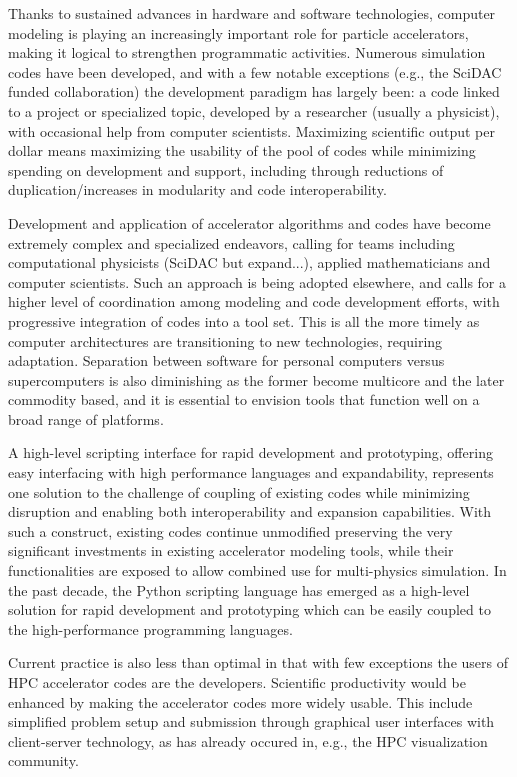 Thanks to sustained advances in hardware and software
technologies, computer modeling is playing an increasingly
important role for particle accelerators, making it logical to
strengthen programmatic activities. Numerous simulation codes
have been developed, and with a few notable exceptions (e.g., the
SciDAC funded collaboration) the development paradigm has largely
been: a code linked to a project or specialized topic, developed
by a researcher (usually a physicist), with occasional help from
computer scientists.  Maximizing scientific output per dollar
means maximizing the usability of the pool of codes while
minimizing spending on development and support, including through
reductions of duplication/increases in modularity and code
interoperability.

Development and application of accelerator algorithms and codes
have become extremely complex and specialized endeavors, calling
for teams including computational physicists (SciDAC but
expand...), applied mathematicians and computer scientists. Such
an approach is being adopted elsewhere, and calls for a higher
level of coordination among modeling and code development
efforts, with progressive integration of codes into a tool set.
This is all the more timely as computer architectures are
transitioning to new technologies, requiring adaptation.
Separation between software for personal computers versus
supercomputers is also diminishing as the former become multicore
and the later commodity based, and it is essential to envision
tools that function well on a broad range of platforms.

A high-level scripting interface for rapid development and
prototyping, offering easy interfacing with high performance
languages and expandability, represents one solution to the
challenge of coupling of existing codes while minimizing
disruption and enabling both interoperability and expansion
capabilities. With such a construct, existing codes continue
unmodified preserving the very significant investments in
existing accelerator modeling tools, while their functionalities
are exposed to allow combined use for multi-physics simulation.
In the past decade, the Python scripting language has emerged as
a high-level solution for rapid development and prototyping which
can be easily coupled to the high-performance programming
languages.


Current practice is also less than optimal in that with few exceptions
the users of HPC accelerator codes are the developers.  Scientific
productivity would be enhanced by making the accelerator codes more
widely usable.  This include simplified problem setup and submission
through graphical user interfaces with client-server technology, as
has already occured in, e.g., the HPC visualization community.

